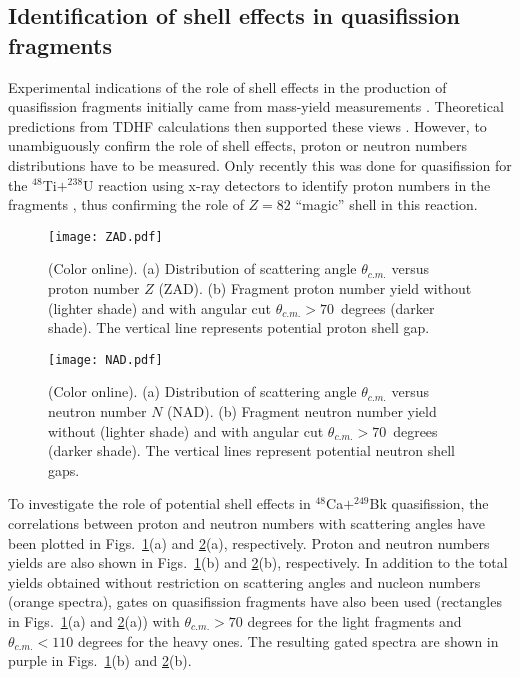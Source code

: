 \documentclass[reprint,aps,prc,twocolumn,floatfix,10pt]{revtex4-2}
\begin{document}
\subsection{Identification of shell effects in quasifission fragments}\label{sec:shell}

Experimental indications of the role of shell effects in the production of quasifission fragments initially came from mass-yield measurements \cite{itkis2004,nishio2008,wakhle2014}.
Theoretical predictions from TDHF calculations then supported these views \cite{wakhle2014,oberacker2014,umar2016}.
However, to unambiguously confirm the role of shell effects, proton or neutron numbers distributions have to be measured.
Only recently this was done for quasifission for the $^{48}$Ti$+^{238}$U reaction using  x-ray detectors to identify proton numbers in the fragments \cite{morjean2017}, thus confirming the role of $Z=82$ ``magic'' shell in this reaction.

\begin{figure}[!htb]
\centerline{\texttt{[image: ZAD.pdf]}}
\caption{\protect(Color online). (a) Distribution of scattering angle $\theta_{c.m.}$ versus proton number $Z$ (ZAD). (b) Fragment proton number yield without (lighter shade) and with angular cut $\theta_{c.m.}>70$~degrees (darker shade). The vertical line represents potential proton shell gap.}
\label{fig:ZAD}
\end{figure}

\begin{figure}[!htb]
\centerline{\texttt{[image: NAD.pdf]}}
\caption{\protect(Color online). (a) Distribution of scattering angle $\theta_{c.m.}$ versus neutron number $N$ (NAD). (b) Fragment neutron number yield without (lighter shade) and with angular cut $\theta_{c.m.}>70$~degrees (darker shade). The vertical lines represent potential neutron shell gaps.}
\label{fig:NAD}
\end{figure}

To investigate the role of potential shell effects in $^{48}$Ca$+^{249}$Bk quasifission, the correlations between proton and neutron numbers with scattering angles have been plotted in Figs.~\ref{fig:ZAD}(a) and \ref{fig:NAD}(a), respectively.
Proton and neutron numbers yields are also shown in  Figs.~\ref{fig:ZAD}(b) and \ref{fig:NAD}(b), respectively.
In addition to the total yields obtained without restriction on scattering angles and nucleon numbers (orange spectra), gates on quasifission fragments have also been used (rectangles in Figs.~\ref{fig:ZAD}(a) and \ref{fig:NAD}(a)) with $\theta_{c.m.}>70$ degrees for the light fragments and $\theta_{c.m.}<110$ degrees for the heavy ones.
The resulting gated spectra are shown in purple in Figs.~\ref{fig:ZAD}(b) and \ref{fig:NAD}(b).
\end{document}

